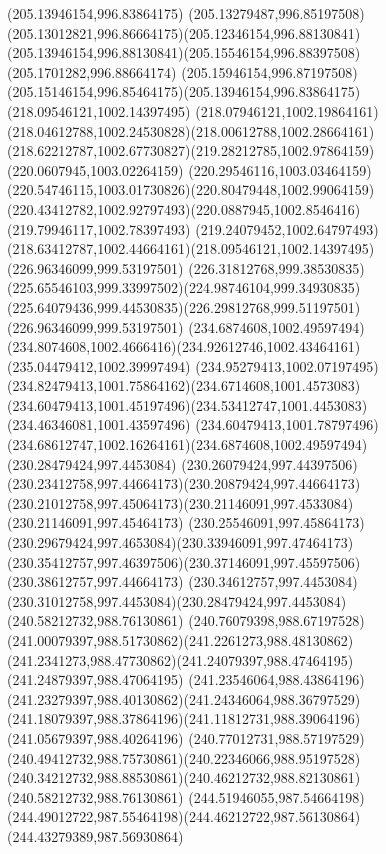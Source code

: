 {{		\moveto(205.13946154,996.83864175)
		\curveto(205.13279487,996.85197508)(205.13012821,996.86664175)(205.12346154,996.88130841)
		\curveto(205.13946154,996.88130841)(205.15546154,996.88397508)(205.1701282,996.88664174)
		\curveto(205.15946154,996.87197508)(205.15146154,996.85464175)(205.13946154,996.83864175)
		\moveto(218.09546121,1002.14397495)
		\curveto(218.07946121,1002.19864161)(218.04612788,1002.24530828)(218.00612788,1002.28664161)
		\curveto(218.62212787,1002.67730827)(219.28212785,1002.97864159)(220.0607945,1003.02264159)
		\curveto(220.29546116,1003.03464159)(220.54746115,1003.01730826)(220.80479448,1002.99064159)
		\curveto(220.43412782,1002.92797493)(220.0887945,1002.8546416)(219.79946117,1002.78397493)
		\curveto(219.24079452,1002.64797493)(218.63412787,1002.44664161)(218.09546121,1002.14397495)
		\moveto(226.96346099,999.53197501)
		\curveto(226.31812768,999.38530835)(225.65546103,999.33997502)(224.98746104,999.34930835)
		\curveto(225.64079436,999.44530835)(226.29812768,999.51197501)(226.96346099,999.53197501)
		\moveto(234.6874608,1002.49597494)
		\curveto(234.8074608,1002.4666416)(234.92612746,1002.43464161)(235.04479412,1002.39997494)
		\curveto(234.95279413,1002.07197495)(234.82479413,1001.75864162)(234.6714608,1001.4573083)
		\curveto(234.60479413,1001.45197496)(234.53412747,1001.4453083)(234.46346081,1001.43597496)
		\curveto(234.60479413,1001.78797496)(234.68612747,1002.16264161)(234.6874608,1002.49597494)
		\moveto(230.28479424,997.4453084)
		\curveto(230.26079424,997.44397506)(230.23412758,997.44664173)(230.20879424,997.44664173)
		\curveto(230.21012758,997.45064173)(230.21146091,997.4533084)(230.21146091,997.45464173)
		\curveto(230.25546091,997.45864173)(230.29679424,997.4653084)(230.33946091,997.47464173)
		\curveto(230.35412757,997.46397506)(230.37146091,997.45597506)(230.38612757,997.44664173)
		\curveto(230.34612757,997.4453084)(230.31012758,997.4453084)(230.28479424,997.4453084)
		\moveto(240.58212732,988.76130861)
		\curveto(240.76079398,988.67197528)(241.00079397,988.51730862)(241.2261273,988.48130862)
		\curveto(241.2341273,988.47730862)(241.24079397,988.47464195)(241.24879397,988.47064195)
		\curveto(241.23546064,988.43864196)(241.23279397,988.40130862)(241.24346064,988.36797529)
		\curveto(241.18079397,988.37864196)(241.11812731,988.39064196)(241.05679397,988.40264196)
		\curveto(240.77012731,988.57197529)(240.49412732,988.75730861)(240.22346066,988.95197528)
		\curveto(240.34212732,988.88530861)(240.46212732,988.82130861)(240.58212732,988.76130861)
		\moveto(244.51946055,987.54664198)
		\curveto(244.49012722,987.55464198)(244.46212722,987.56130864)(244.43279389,987.56930864)
}}

